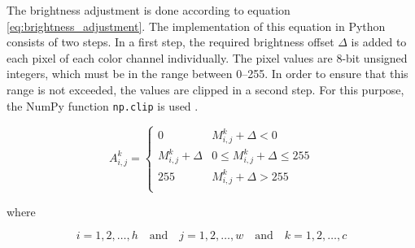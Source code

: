 The brightness adjustment is done according to equation \ref{eq:brightness_adjustment}.
The implementation of this equation in Python consists of two steps.
In a first step, the required brightness offset $\Delta$ is added to each pixel of each color channel individually.
The pixel values are 8-bit unsigned integers, which must be in the range between \numrange{0}{255}.
In order to ensure that this range is not exceeded, the values are clipped in a second step.
For this purpose, the NumPy function \texttt{np.clip} is used \cite{}. %

\begin{equation}
  A_{i,j}^{k} =
  \begin{cases}
    0 & M_{i,j}^{k} + \Delta < 0 \\
    M_{i,j}^{k} + \Delta & 0\leq M_{i,j}^{k} + \Delta\leq 255 \\
    255 & M_{i,j}^{k} + \Delta > 255 \\
  \end{cases}
  \label{eq:brightness_adjustment}
\end{equation}

where

\[
  i = 1, 2, \dots, h \quad \text{and} \quad j = 1, 2, \dots, w \quad \text{and} \quad k = 1, 2, \dots, c
\]

